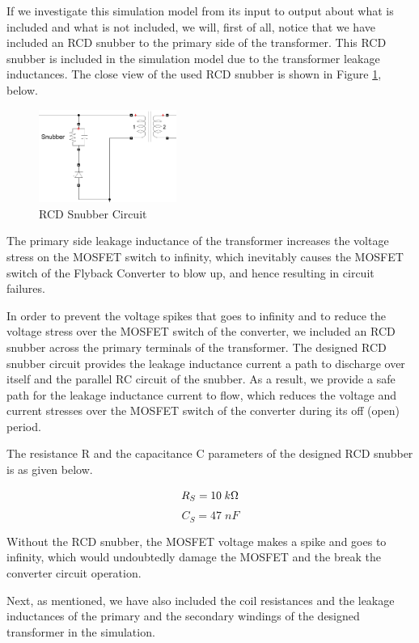 If we investigate this simulation model from its input to output about what is included and what is not included, we will, first of all, notice that we have included an RCD snubber to the primary side of the transformer. This RCD snubber is included in the simulation model due to the transformer leakage inductances. The close view of the used RCD snubber is shown in Figure \ref{fig:fly_snubber}, below.

\begin{figure}[H]
\begin{center}
\includegraphics[width=0.4\textwidth]{simulations/snubber.png}
\caption{RCD Snubber Circuit}
\label{fig:fly_snubber}
\end{center}
\end{figure}

The primary side leakage inductance of the transformer increases the voltage stress on the MOSFET switch to infinity, which inevitably causes the MOSFET switch of the Flyback Converter to blow up, and hence resulting in circuit failures.

In order to prevent the voltage spikes that goes to infinity and to reduce the voltage stress over the MOSFET switch of the converter, we included an RCD snubber across the primary terminals of the transformer. The designed RCD snubber circuit provides the leakage inductance current a path to discharge over itself and the parallel RC circuit of the snubber. As a result, we provide a safe path for the leakage inductance current to flow, which reduces the voltage and current stresses over the MOSFET switch of the converter during its off (open) period.

The resistance R and the capacitance C parameters of the designed RCD snubber is as given below.

$$ R_S = 10\;k\ohm $$
$$ C_S = 47\;nF $$

Without the RCD snubber, the MOSFET voltage makes a spike and goes to infinity, which would undoubtedly damage the MOSFET and the break the converter circuit operation.

Next, as mentioned, we have also included the coil resistances and the leakage inductances of the primary and the secondary windings of the designed transformer in the simulation.

